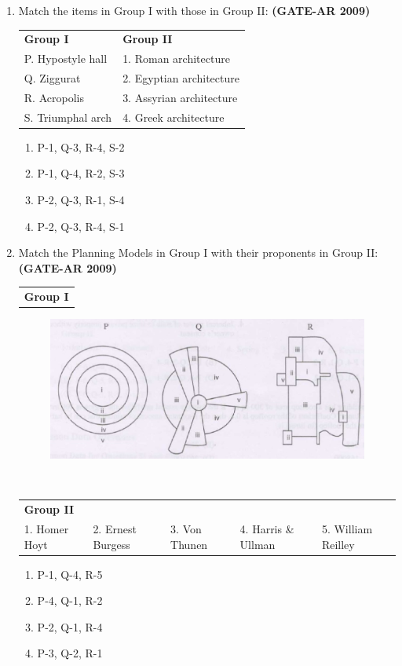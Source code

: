 \documentclass[a4paper,10pt]{article}
\begin{document}
\begin{enumerate}
    \item Match the items in Group I with those in Group II: \hfill \textbf{(GATE-AR 2009)} \\
    \begin{tabular}{ l l }
	\textbf{Group I} & \textbf{Group II} \\
	P. Hypostyle hall & 1. Roman architecture \\
	Q. Ziggurat & 2. Egyptian architecture \\
	R. Acropolis & 3. Assyrian architecture \\
	S. Triumphal arch & 4. Greek architecture \\
	\end{tabular}
	\begin{multicols}{2}
	\begin{enumerate}
        \item P-1, Q-3, R-4, S-2
        \item P-1, Q-4, R-2, S-3
        \item P-2, Q-3, R-1, S-4
        \item P-2, Q-3, R-4, S-1
    \end{enumerate}
	\end{multicols}

    \item Match the Planning Models in Group I with their proponents in Group II: \hfill \textbf{(GATE-AR 2009)} \\
    \begin{tabular}{ l }
	\textbf{Group I} \\
	\end{tabular}
	\begin{figure}[h!]
        \centering
        \includegraphics[width=0.5\linewidth]{figs/img_03.jpg}
        \label{fig:Img03}
    \end{figure} \\
    \begin{tabular}{ l l l l l }
	\textbf{Group II} & & \\
	1. Homer Hoyt & 2. Ernest Burgess & 3. Von Thunen & 4. Harris \& Ullman & 5. William Reilley \\
	\end{tabular}
	\begin{multicols}{2}
	\begin{enumerate}
        \item P-1, Q-4, R-5
        \item P-4, Q-1, R-2
        \item P-2, Q-1, R-4
        \item P-3, Q-2, R-1
    \end{enumerate}
	\end{multicols}


\end{enumerate}
\end{document}
